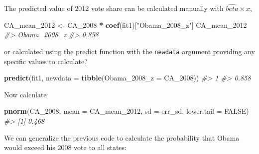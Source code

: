 \documentclass[]{book}
\newenvironment{Shaded}{\begin{snugshade}}{\end{snugshade}}
\newcommand{\KeywordTok}[1]{\textcolor[rgb]{0.13,0.29,0.53}{\textbf{#1}}}
\newcommand{\DataTypeTok}[1]{\textcolor[rgb]{0.13,0.29,0.53}{#1}}
\newcommand{\DecValTok}[1]{\textcolor[rgb]{0.00,0.00,0.81}{#1}}
\newcommand{\StringTok}[1]{\textcolor[rgb]{0.31,0.60,0.02}{#1}}
\newcommand{\CommentTok}[1]{\textcolor[rgb]{0.56,0.35,0.01}{\textit{#1}}}
\newcommand{\OtherTok}[1]{\textcolor[rgb]{0.56,0.35,0.01}{#1}}
\newcommand{\OperatorTok}[1]{\textcolor[rgb]{0.81,0.36,0.00}{\textbf{#1}}}
\newcommand{\NormalTok}[1]{#1}
\theoremstyle{definition}
\theoremstyle{definition}
\theoremstyle{definition}
\theoremstyle{remark}
\begin{document}
The predicted value of 2012 vote share can be calculated manually with
\(\hat{beta} \times x\),

\begin{Shaded}
\begin{Highlighting}[]
\NormalTok{CA_mean_}\DecValTok{2012}\NormalTok{ <-}\StringTok{ }\NormalTok{CA_}\DecValTok{2008} \OperatorTok{*}\StringTok{ }\KeywordTok{coef}\NormalTok{(fit1)[}\StringTok{"Obama_2008_z"}\NormalTok{]}
\NormalTok{CA_mean_}\DecValTok{2012}
\CommentTok{#> Obama_2008_z }
\CommentTok{#>        0.858}
\end{Highlighting}
\end{Shaded}

or calculated using the predict function with the \texttt{newdata}
argument providing any specific values to calculate?

\begin{Shaded}
\begin{Highlighting}[]
\KeywordTok{predict}\NormalTok{(fit1, }\DataTypeTok{newdata =} \KeywordTok{tibble}\NormalTok{(}\DataTypeTok{Obama_2008_z =}\NormalTok{ CA_}\DecValTok{2008}\NormalTok{))}
\CommentTok{#>     1 }
\CommentTok{#> 0.858}
\end{Highlighting}
\end{Shaded}

Now calculate

\begin{Shaded}
\begin{Highlighting}[]
\KeywordTok{pnorm}\NormalTok{(CA_}\DecValTok{2008}\NormalTok{, }\DataTypeTok{mean =}\NormalTok{ CA_mean_}\DecValTok{2012}\NormalTok{, }\DataTypeTok{sd =}\NormalTok{ err_sd,}
      \DataTypeTok{lower.tail =} \OtherTok{FALSE}\NormalTok{)}
\CommentTok{#> [1] 0.468}
\end{Highlighting}
\end{Shaded}

We can generalize the previous code to calculate the probability that
Obama would exceed his 2008 vote to all states:

\begin{Shaded}
\end{Shaded}
\end{document}
